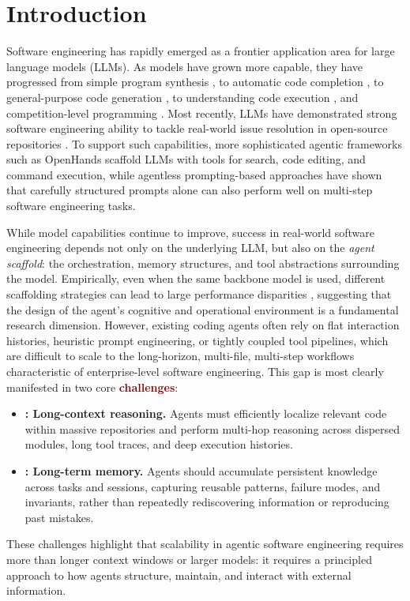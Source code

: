 \section{Introduction}

Software engineering has rapidly emerged as a frontier application area for large language models (LLMs).  
As models have grown more capable, they have progressed from simple program synthesis \citep{austin2021program}, to automatic code completion \citep{humaneval}, to general-purpose code generation \citep{li2022competition, lai2023ds}, to understanding code execution \citep{gu2024cruxeval}, and competition-level programming \citep{jain2024livecodebench}.  
Most recently, LLMs have demonstrated strong software engineering ability to tackle real-world issue resolution in open-source repositories \citep{swebench, sweagent, xia2025live, satoriswe}.  
To support such capabilities, more sophisticated agentic frameworks such as OpenHands \citep{openhands} scaffold LLMs with tools for search, code editing, and command execution, while agentless prompting-based approaches \citep{xia2024agentless} have shown that carefully structured prompts alone can also perform well on multi-step software engineering tasks. 

While model capabilities continue to improve, success in real-world software engineering depends not only on the underlying LLM, but also on the \emph{agent scaffold}: the orchestration, memory structures, and tool abstractions surrounding the model. Empirically, even when the same backbone model is used, different scaffolding strategies can lead to large performance disparities \citep{xia2025live}, suggesting that the design of the agent’s cognitive and operational environment is a fundamental research dimension. However, existing coding agents often rely on flat interaction histories, heuristic prompt engineering, or tightly coupled tool pipelines, which are difficult to scale to the long-horizon, multi-file, multi-step workflows characteristic of enterprise-level software engineering.
This gap is most clearly manifested in two core \textcolor{darkred}{\textbf{challenges}}:
\begin{itemize}[leftmargin=*]
    \item \textbf{\COne: Long-context reasoning.} Agents must efficiently localize relevant code within massive repositories and perform multi-hop reasoning across dispersed modules, long tool traces, and deep execution histories.
    \item \textbf{\CTwo: Long-term memory.} Agents should accumulate persistent knowledge across tasks and sessions, capturing reusable patterns, failure modes, and invariants, rather than repeatedly rediscovering information or reproducing past mistakes.
\end{itemize}
These challenges highlight that scalability in agentic software engineering requires more than longer context windows or larger models: it requires a principled approach to how agents structure, maintain, and interact with external information.




